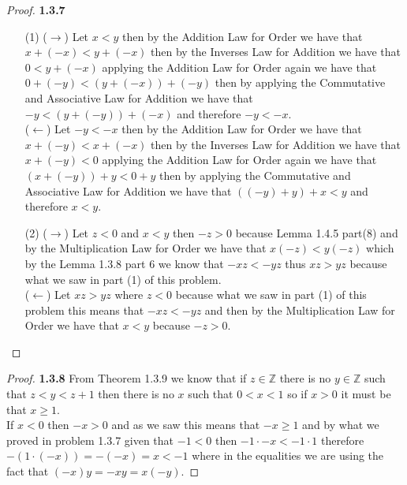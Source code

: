 \documentclass[11pt]{article}
\newcommand{\Z}{\mathbb{Z}}
\theoremstyle{definition}
\begin{document}
    \begin{proof}{\textbf{1.3.7}}
    \begin{itemize}
        \item [(1)] ($\rightarrow$)
        Let $x < y$ then by the Addition Law for Order we have that $x + (-x) < y+(-x)$
        then by the Inverses Law for Addition we have that $0 < y+(-x)$ applying the
        Addition Law for Order again we have that $0 +(-y) < (y+(-x))+(-y)$ then by applying
        the Commutative and Associative Law for Addition we have that $-y < (y+(-y))+(-x)$
        and therefore $-y < -x$.\\
        ($\leftarrow$)
        Let $-y <-x$ then by the Addition Law for Order we have that $x + (-y) < x+(-x)$
        then by the Inverses Law for Addition we have that $x+(-y) < 0$ applying the
        Addition Law for Order again we have that $(x + (-y))+y < 0 + y$ then by applying
        the Commutative and Associative Law for Addition we have that $((-y)+y)+x < y$
        and therefore $x < y$.
        \item [(2)] ($\rightarrow$)
        Let $z<0$ and $x<y$ then $-z > 0$ because Lemma 1.4.5 part(8) and by the
        Multiplication Law for Order we have that $x(-z) < y(-z)$ which by the Lemma
        1.3.8 part 6 we know that $-xz < -yz$ thus $xz > yz$ because what we saw in part
        (1) of this problem.\\
        ($\leftarrow$)
        Let $xz>yz$ where $z <0$ because what we saw in part (1) of this problem this
        means that $-xz < -yz$ and then by the Multiplication Law for Order we have that
        $x<y$ because $-z > 0$.
    \end{itemize}
    \end{proof}
    \begin{proof}{\textbf{1.3.8}}
        From Theorem 1.3.9 we know that if $z \in \Z$ there is no $y \in \Z$ such that
        $z<y<z+1$ then there is no $x$ such that $0<x<1$ so if $x>0$ it must be that
        $x \geq 1$.\\
        If $x<0$ then $-x>0$ and as we saw this means that $-x\geq 1$ and by what we
        proved in problem 1.3.7 given that $-1<0$ then $-1 \cdot -x < -1 \cdot 1$
        therefore $-(1 \cdot (-x)) = -(-x) = x < -1$ where in the equalities we are
        using the fact that $(-x)y = -xy = x(-y)$.  
    \end{proof}
\end{document}
